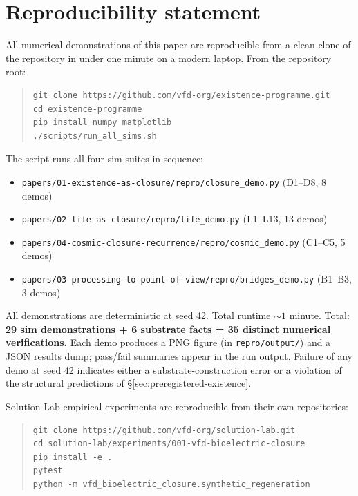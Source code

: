 \documentclass[11pt]{article}
\theoremstyle{plain}
\theoremstyle{definition}
\theoremstyle{remark}
\begin{document}
\section{Reproducibility statement}\label{sec:reproducibility}

All numerical demonstrations of this paper are reproducible from a clean clone of the repository in under one minute on a modern laptop. From the repository root:

\begin{quote}\small
\begin{verbatim}
git clone https://github.com/vfd-org/existence-programme.git
cd existence-programme
pip install numpy matplotlib
./scripts/run_all_sims.sh
\end{verbatim}
\end{quote}

The script runs all four sim suites in sequence:

\begin{itemize}[leftmargin=2em]
\item \texttt{papers/01-existence-as-closure/repro/closure\_demo.py} (D1--D8, 8 demos)
\item \texttt{papers/02-life-as-closure/repro/life\_demo.py} (L1--L13, 13 demos)
\item \texttt{papers/04-cosmic-closure-recurrence/repro/cosmic\_demo.py} (C1--C5, 5 demos)
\item \texttt{papers/03-processing-to-point-of-view/repro/bridges\_demo.py} (B1--B3, 3 demos)
\end{itemize}

All demonstrations are deterministic at seed 42. Total runtime $\sim 1$ minute. Total: \textbf{29 sim demonstrations + 6 substrate facts = 35 distinct numerical verifications.} Each demo produces a PNG figure (in \texttt{repro/output/}) and a JSON results dump; pass/fail summaries appear in the run output. Failure of any demo at seed 42 indicates either a substrate-construction error or a violation of the structural predictions of \S\ref{sec:preregistered-existence}.

Solution Lab empirical experiments are reproducible from their own repositories:

\begin{quote}\small
\begin{verbatim}
git clone https://github.com/vfd-org/solution-lab.git
cd solution-lab/experiments/001-vfd-bioelectric-closure
pip install -e .
pytest
python -m vfd_bioelectric_closure.synthetic_regeneration
\end{verbatim}
\end{quote}
\end{document}
